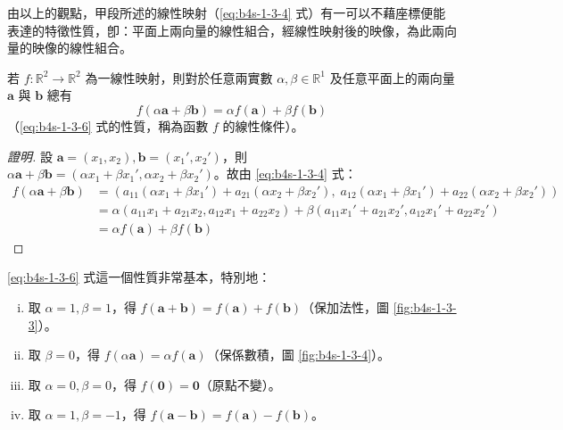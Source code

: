由以上的觀點，甲段所述的線性映射（\eqref{eq:b4s-1-3-4} 式）有一可以不藉座標便能表達的特徵性質，卽：平面上兩向量的線性組合，經線性映射後的映像，為此兩向量的映像的線性組合。

\begin{theorem}[定理 3]
若 $f: \mathbb{R}^2 \to \mathbb{R}^2$ 為一線性映射，則對於任意兩實數 $\alpha, \beta \in \mathbb{R}^1$ 及任意平面上的兩向量 $\mathbf{a}$ 與 $\mathbf{b}$ 總有
\begin{equation}
f(\alpha\mathbf{a} + \beta\mathbf{b}) = \alpha f(\mathbf{a}) + \beta f(\mathbf{b}) \label{eq:b4s-1-3-6}
\end{equation}
（\eqref{eq:b4s-1-3-6} 式的性質，稱為函數 $f$ 的線性條件）。
\end{theorem}

\begin{proof}[證明]
設 $\mathbf{a} = (x_1, x_2), \mathbf{b} = (x_1', x_2')$，則 $\alpha\mathbf{a} + \beta\mathbf{b} = (\alpha x_1 + \beta x_1', \alpha x_2 + \beta x_2')$。故由 \eqref{eq:b4s-1-3-4} 式：
\begin{align*}
f(\alpha\mathbf{a} + \beta\mathbf{b}) &= (a_{11}(\alpha x_1 + \beta x_1') + a_{21}(\alpha x_2 + \beta x_2'), \; a_{12}(\alpha x_1 + \beta x_1') + a_{22}(\alpha x_2 + \beta x_2')) \\
&= \alpha(a_{11}x_1 + a_{21}x_2, a_{12}x_1 + a_{22}x_2) + \beta(a_{11}x_1' + a_{21}x_2', a_{12}x_1' + a_{22}x_2') \\
&= \alpha f(\mathbf{a}) + \beta f(\mathbf{b})
\end{align*}
\end{proof}

\eqref{eq:b4s-1-3-6} 式這一個性質非常基本，特別地：
\begin{enumerate}[(i)]
  \item 取 $\alpha = 1, \beta = 1$，得 $f(\mathbf{a} + \mathbf{b}) = f(\mathbf{a}) + f(\mathbf{b})$（保加法性，圖 \ref{fig:b4s-1-3-3}）。
  \item 取 $\beta = 0$，得 $f(\alpha\mathbf{a}) = \alpha f(\mathbf{a})$（保係數積，圖 \ref{fig:b4s-1-3-4}）。
  \item 取 $\alpha = 0, \beta = 0$，得 $f(\mathbf{0}) = \mathbf{0}$（原點不變）。
  \item 取 $\alpha = 1, \beta = -1$，得 $f(\mathbf{a} - \mathbf{b}) = f(\mathbf{a}) - f(\mathbf{b})$。
\end{enumerate}

